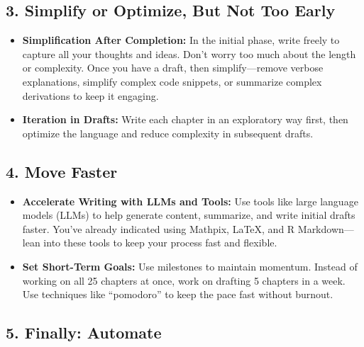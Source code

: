 \documentclass[
  12 pt,
  a4paper,
]{book}
\providecommand{\tightlist}{%
  \setlength{\itemsep}{0pt}\setlength{\parskip}{0pt}}
\numberwithin{equation}{section}
\theoremstyle{plain}      %
\theoremstyle{definition} %
\theoremstyle{remark}     %
\theoremstyle{note}         %
\begin{document}
\hypertarget{simplify-or-optimize-but-not-too-early}{%
\subsection*{\texorpdfstring{3. \textbf{Simplify or Optimize, But Not
Too
Early}}{3. Simplify or Optimize, But Not Too Early}}\label{simplify-or-optimize-but-not-too-early}}

\begin{itemize}
\tightlist
\item
  \textbf{Simplification After Completion:} In the initial phase, write
  freely to capture all your thoughts and ideas. Don't worry too much
  about the length or complexity. Once you have a draft, then
  simplify---remove verbose explanations, simplify complex code
  snippets, or summarize complex derivations to keep it engaging.
\item
  \textbf{Iteration in Drafts:} Write each chapter in an exploratory way
  first, then optimize the language and reduce complexity in subsequent
  drafts.
\end{itemize}

\hypertarget{move-faster}{%
\subsection*{\texorpdfstring{4. \textbf{Move
Faster}}{4. Move Faster}}\label{move-faster}}

\begin{itemize}
\tightlist
\item
  \textbf{Accelerate Writing with LLMs and Tools:} Use tools like large
  language models (LLMs) to help generate content, summarize, and write
  initial drafts faster. You've already indicated using Mathpix, LaTeX,
  and R Markdown---lean into these tools to keep your process fast and
  flexible.
\item
  \textbf{Set Short-Term Goals:} Use milestones to maintain momentum.
  Instead of working on all 25 chapters at once, work on drafting 5
  chapters in a week. Use techniques like ``pomodoro'' to keep the pace
  fast without burnout.
\end{itemize}

\hypertarget{finally-automate}{%
\subsection*{\texorpdfstring{5. \textbf{Finally:
Automate}}{5. Finally: Automate}}\label{finally-automate}}
\end{document}
